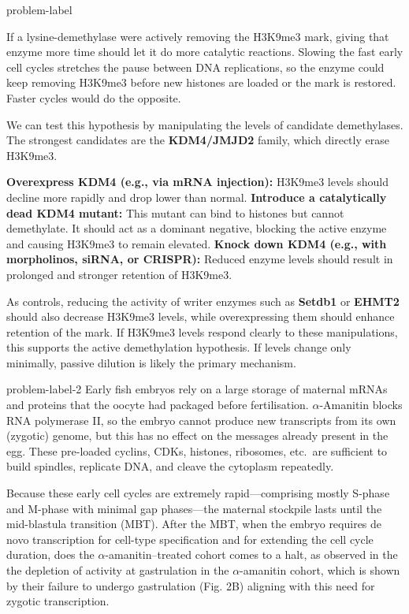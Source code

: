 \begin{multicols}{2}

\begin{problem}{}{problem-label}
    
    If a lysine-demethylase were actively removing the H3K9me3 mark, giving that enzyme more time should let it do more catalytic reactions. Slowing the fast early cell cycles stretches the pause between DNA replications, so the enzyme could keep removing H3K9me3 before new histones are loaded or the mark is restored. Faster cycles would do the opposite.

    We can test this hypothesis by manipulating the levels of candidate demethylases. The strongest candidates are the \textbf{KDM4/JMJD2} family, which directly erase H3K9me3.
    
    
    \textbf{Overexpress KDM4 (e.g., via mRNA injection):} H3K9me3 levels should decline more rapidly and drop lower than normal.
    \textbf{Introduce a catalytically dead KDM4 mutant:} This mutant can bind to histones but cannot demethylate. It should act as a dominant negative, blocking the active enzyme and causing H3K9me3 to remain elevated.
    \textbf{Knock down KDM4 (e.g., with morpholinos, siRNA, or CRISPR):} Reduced enzyme levels should result in prolonged and stronger retention of H3K9me3.
    
    
    \noindent As controls, reducing the activity of writer enzymes such as \textbf{Setdb1} or \textbf{EHMT2} should also decrease H3K9me3 levels, while overexpressing them should enhance retention of the mark. If H3K9me3 levels respond clearly to these manipulations, this supports the active demethylation hypothesis. If levels change only minimally, passive dilution is likely the primary mechanism.      


\end{problem}


\begin{problem}{}{problem-label-2}
    Early fish embryos rely on a large storage of maternal mRNAs and proteins that the oocyte had packaged before fertilisation. \(\alpha\)-Amanitin blocks RNA polymerase II, so the embryo cannot produce new transcripts from its own (zygotic) genome, but this has no effect on the messages already present in the egg. These pre-loaded cyclins, CDKs, histones, ribosomes, etc.\ are sufficient to build spindles, replicate DNA, and cleave the cytoplasm repeatedly.

    Because these early cell cycles are extremely rapid—comprising mostly S-phase and M-phase with minimal gap phases—the maternal stockpile lasts until the mid-blastula transition (MBT). After the MBT, when the embryo requires de novo transcription for cell-type specification and for extending the cell cycle duration, does the \(\alpha\)-amanitin–treated cohort comes to a halt, as observed in the the depletion of activity at gastrulation in the \(\alpha\)-amanitin cohort, which is shown by their failure to undergo gastrulation (Fig. 2B) aligning with this need for zygotic transcription.
    

\end{problem}
\end{multicols}

